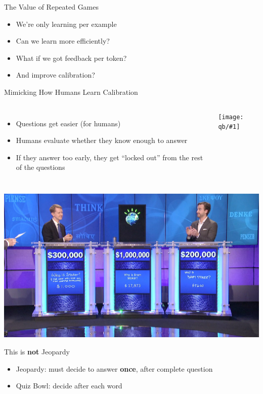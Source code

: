 \documentclass[compress]{beamer}
\newcommand{\gfxq}[2]{
\begin{center}
	\texttt{[image: qb/\#1]}
\end{center}
}
\begin{document}
\begin{frame}{The Value of Repeated Games}

  \begin{itemize}
  \item We're only learning per example
  \item Can we learn more efficiently?
  \item What if we got feedback per token?
    \pause
  \item And improve calibration?
  \end{itemize}

\end{frame}

\begin{frame}{Mimicking How Humans Learn Calibration}
	\begin{columns}
		\begin{itemize}
			\item Questions get easier
			(for humans)
			\item Humans evaluate whether they know enough to answer
			\item If they answer too early, they get “locked out” from the rest of the questions
			
		\end{itemize}
		
		\gfxq{example_game}{1.0}
	\end{columns}
	
\end{frame}

\begin{frame}[plain]
  \vspace{-2cm}
		\includegraphics[width=1.0\linewidth]{qb/jeopardy}
                \pause
                \vspace{-8cm}
         \begin{block}{This is {\bf not} Jeopardy}
		\begin{itemize}
                        \item Jeopardy: must decide to answer {\bf once}, after
                          complete question
                        \item Quiz Bowl: decide after each word
		\end{itemize}

	\end{block}

\end{frame}
\end{document}
